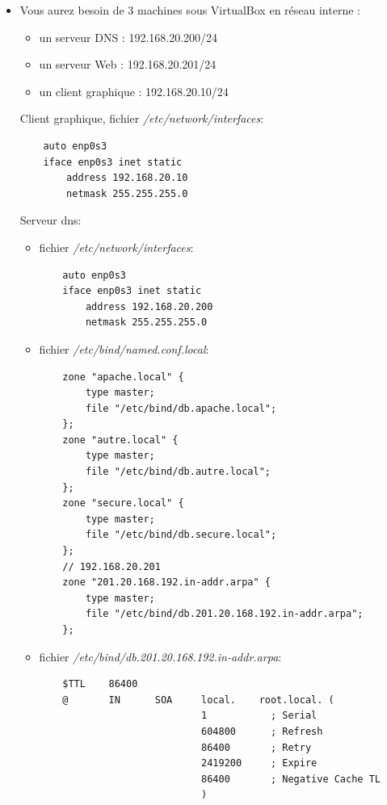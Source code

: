 \documentclass[a4paper]{article}
\begin{document}
\begin{itemize}

\item Vous aurez besoin de 3 machines sous VirtualBox en réseau interne :
\begin{itemize}
    \item un serveur DNS : 192.168.20.200/24
    \item un serveur Web : 192.168.20.201/24
    \item un client graphique : 192.168.20.10/24
\end{itemize}
\begin{example}
    Client graphique, fichier \textit{/etc/network/interfaces}:
    \begin{verbatim}
    auto enp0s3
    iface enp0s3 inet static
        address 192.168.20.10
        netmask 255.255.255.0
    \end{verbatim}
    Serveur dns:
    \begin{itemize}
        \item fichier \textit{/etc/network/interfaces}:
        \begin{verbatim}
    auto enp0s3
    iface enp0s3 inet static
        address 192.168.20.200
        netmask 255.255.255.0
        \end{verbatim}
        \item fichier \textit{/etc/bind/named.conf.local}:
        \begin{verbatim}
    zone "apache.local" {
        type master;
        file "/etc/bind/db.apache.local";
    };
    zone "autre.local" {
        type master;
        file "/etc/bind/db.autre.local";
    };
    zone "secure.local" {
        type master;
        file "/etc/bind/db.secure.local";
    };
    // 192.168.20.201
    zone "201.20.168.192.in-addr.arpa" {
        type master;
        file "/etc/bind/db.201.20.168.192.in-addr.arpa";
    };
        \end{verbatim}
        \item fichier \textit{/etc/bind/db.201.20.168.192.in-addr.arpa}:
        \begin{verbatim}
    $TTL    86400
    @       IN      SOA     local.    root.local. (
                            1           ; Serial
                            604800      ; Refresh
                            86400       ; Retry
                            2419200     ; Expire
                            86400       ; Negative Cache TL
                            )


\end{verbatim}
\end{itemize}
\end{example}
\end{itemize}
\end{document}

